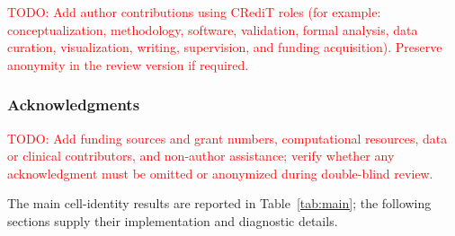 \documentclass{article} %
\newcommand{\todo}[1]{\textcolor{red}{TODO: #1}}
\begin{document}
\noindent\todo{Add author contributions using CRediT roles (for example: conceptualization, methodology, software, validation, formal analysis, data curation, visualization, writing, supervision, and funding acquisition). Preserve anonymity in the review version if required.}

\subsubsection*{Acknowledgments}

\noindent\todo{Add funding sources and grant numbers, computational resources, data or clinical contributors, and non-author assistance; verify whether any acknowledgment must be omitted or anonymized during double-blind review.}




\appendix


The main cell-identity results are reported in Table~\ref{tab:main}; the
following sections supply their implementation and diagnostic details.


\end{document}
